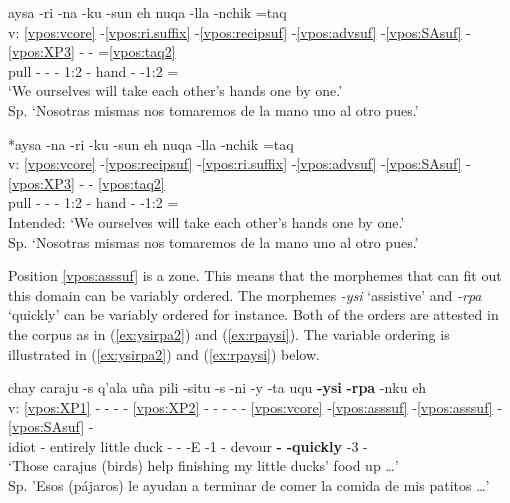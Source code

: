\documentclass[output=paper]{langscibook}
\begin{document}
\ea \label{ex:rina}{
    \glll {} aysa -ri -na -ku -sun eh nuqa -lla -nchik =taq \\
    v: \ref{vpos:vcore} -\ref{vpos:ri.suffix} -\ref{vpos:recipsuf} -\ref{vpos:advsuf} -\ref{vpos:SAsuf} - \ref{vpos:XP3} - - =\ref{vpos:taq2} \\
    {} pull -\Incept{} -\Recp{} -\Refl{} 1:2\Pl{} - hand -\Limit{} -1:2\Pl{} =\Conj{} \\
    \glt `We ourselves will take each other's hands one by one.' \\ Sp. `Nosotras mismas nos tomaremos de la mano uno al otro pues.' }
\z 

\ea \label{ex:nari}{
    \glll {} *aysa -na -ri -ku -sun eh nuqa -lla -nchik =taq \\
    v: \ref{vpos:vcore} -\ref{vpos:recipsuf} -\ref{vpos:ri.suffix} -\ref{vpos:advsuf} -\ref{vpos:SAsuf} - \ref{vpos:XP3} - - \ref{vpos:taq2} \\
    {} pull -\Recp{} -\Incept{} -\Refl{} 1:2\Pl{} - hand -\Limit{} -1:2\Pl{} =\Conj{} \\
    \glt Intended: `We ourselves will take each other's hands one by one.' \\ Sp. `Nosotras mismas nos tomaremos de la mano uno al otro pues.' }
\z 

Position \ref{vpos:asssuf} is a zone. This means that the morphemes that can fit out this domain can be variably ordered. The morphemes \textit{-ysi} `assistive' and \textit{-rpa} `quickly' can be variably ordered for instance. Both of the orders are attested in the corpus as in (\ref{ex:ysirpa2}) and (\ref{ex:rpaysi}). The variable ordering is illustrated in (\ref{ex:ysirpa2}) and (\ref{ex:rpaysi}) below.

\ea \label{ex:ysirpa2}{
    \glll {} chay caraju -s q'ala uña pili -situ -s -ni -y -ta uqu \textbf{-ysi} \textbf{-rpa} -nku eh \\
    v: \ref{vpos:XP1} - - - - \ref{vpos:XP2} - - - - - \ref{vpos:vcore} -\ref{vpos:asssuf} -\ref{vpos:asssuf} -\ref{vpos:SAsuf} - \\
    {} \Dem{} idiot -\Pl{} entirely little duck -\Dim{} -\Pl{} -E -1\Sg{}\Poss{} -\Acc{} devour \textbf{-\Assist{}} \textbf{-quickly} -3\Pl{} - \\
    \glt `Those carajus (birds) help finishing my little ducks' food up …' \\ Sp. 'Esos (pájaros) le ayudan a terminar de comer la comida de mis patitos …' }
\z 
\end{document}
